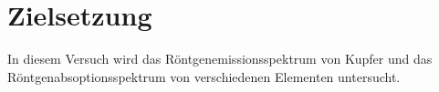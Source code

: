 \section{Zielsetzung}
\label{sec:Zielsetzung}

In diesem Versuch wird das Röntgenemissionsspektrum von Kupfer und das Röntgenabsoptionsspektrum von verschiedenen Elementen untersucht.
